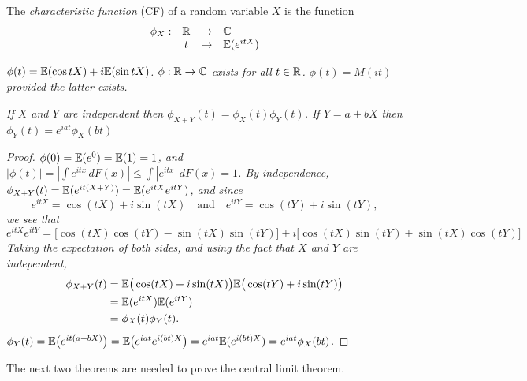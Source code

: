 \begin{definition}
The \emph{characteristic function} (CF) of a random variable $X$ is the function 
\[
\begin{array}{rccl}
\phi_X:	& \mathbb{R}	& \to		& \mathbb{C} \\
		& t		& \mapsto	& \mathbb{E}(e^{itX})
\end{array}
\]
\end{definition}

\begin{remark}
\bit
\it $\phi(t) = \mathbb{E}(\cos tX)+ i\mathbb{E}(\sin tX)$.
\it $\phi:\mathbb{R}\to\mathbb{C}$ exists for all $t\in\mathbb{R}$.
\it $\phi(t) = M(it)$ provided the latter exists.
\eit
\end{remark}

\begin{theorem}\label{thm:properties_cf}
\ben
\it If $X$ and $Y$ are independent then $\phi_{X+Y}(t) = \phi_X(t)\phi_Y(t)$.
\it If $Y = a + bX$ then $\phi_Y(t) = e^{iat}\phi_X(bt)$
\een
\end{theorem}

\begin{proof}
\ben
\it %
$\phi(0)=\mathbb{E}(e^0)=\mathbb{E}(1) = 1$, and 
$\displaystyle |\phi(t)| = \left|\int e^{itx}\,dF(x)\right| \leq \int |e^{itx}|\,dF(x) = 1$.
\it %
By independence, $\phi_{X+Y}(t) = \mathbb{E}(e^{it(X+Y)}) = \mathbb{E}(e^{itX}e^{itY})$, and since 
\[
e^{itX} = \cos(tX) + i\sin(tX)\quad\text{and}\quad e^{itY} = \cos(tY) + i\sin(tY),
\]
we see that 
\[
e^{itX}e^{itY} = \big[\cos(tX)\cos(tY) - \sin(tX)\sin(tY)\big] + i\big[\cos(tX)\sin(tY) + \sin(tX)\cos(tY)\big]
\]
Taking the expectation of both sides, and using the fact that $X$ and $Y$ are independent, 
\begin{align*}
\phi_{X+Y}(t) 
	& = \mathbb{E}\big(\cos(tX)+i\sin(tX)\big)\mathbb{E}\big(\cos(tY)+i\sin(tY)\big) \\
	& = \mathbb{E}(e^{itX})\mathbb{E}(e^{itY}) \\
	& = \phi_X(t)\phi_Y(t).
\end{align*}
\it %
$\phi_Y(t) 
	= \mathbb{E}\big(e^{it(a+bX)}\big) 
	= \mathbb{E}\big(e^{iat}e^{i(bt)X}\big) 
	= e^{iat}\mathbb{E}(e^{i(bt)X}) 
	= e^{iat}\phi_X(bt)$.
\een
\end{proof}


The next two theorems are needed to prove the central limit theorem.

